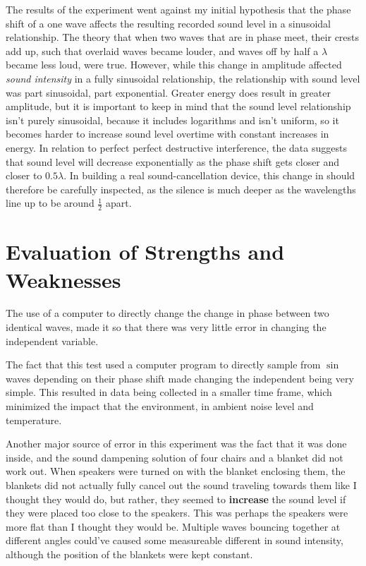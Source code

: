 \documentclass[index]{subfiles}
\begin{document}
The results of the experiment went against my initial hypothesis that the phase shift of a one wave affects the resulting recorded sound level in a sinusoidal relationship. The theory that when two waves that are in phase meet, their crests add up, such that overlaid waves became louder, and waves off by half a \(\lambda\) became less loud, were true. However, while this change in amplitude affected \textit{sound intensity} in a fully sinusoidal relationship, the relationship with sound level was part sinusoidal, part exponential.
Greater energy does result in greater amplitude, but it is important to keep in mind that the sound level relationship isn't purely sinusoidal, because it includes logarithms and isn't uniform, so it becomes harder to increase sound level overtime with constant increases in energy.
In relation to perfect perfect destructive interference, the data suggests that sound level will decrease exponentially as the phase shift gets closer and closer to \(0.5\lambda\). In building a real sound-cancellation device, this change in should therefore be carefully inspected, as the silence is much deeper as the wavelengths line up to be around \(\frac{1}{2}\) apart.

\section{Evaluation of Strengths and Weaknesses}
The use of a computer to directly change the change in phase between two identical waves, made it so that there was very little error in changing the independent variable.

The fact that this test used a computer program to directly sample from \(\sin\) waves depending on their phase shift made changing the independent being very simple. This resulted in data being collected in a smaller time frame, which minimized the impact that the environment, in ambient noise level and temperature.

Another major source of error in this experiment was the fact that it was done inside, and the sound dampening solution of four chairs and a blanket did not work out. When speakers were turned on with the blanket enclosing them, the blankets did not actually fully cancel out the sound traveling towards them like I thought they would do, but rather, they seemed to \textbf{increase} the sound level if they were placed too close to the speakers. This was perhaps the speakers were more flat than I thought they would be. Multiple waves bouncing together at different angles could've caused some measureable different in sound intensity, although the position of the blankets were kept constant.
\end{document}
